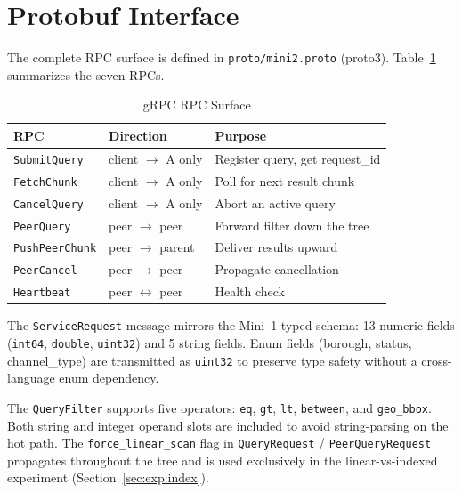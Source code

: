 \documentclass[conference]{IEEEtran}
\begin{document}
\section{Protobuf Interface}
\label{sec:proto}

The complete RPC surface is defined in \texttt{proto/mini2.proto} (proto3).
Table~\ref{tab:rpcs} summarizes the seven RPCs.

\begin{table}[h]
\centering
\caption{gRPC RPC Surface}
\label{tab:rpcs}
\begin{tabular}{lll}
\toprule
RPC & Direction & Purpose \\
\midrule
\texttt{SubmitQuery}   & client $\to$ A only  & Register query, get request\_id \\
\texttt{FetchChunk}   & client $\to$ A only  & Poll for next result chunk \\
\texttt{CancelQuery}  & client $\to$ A only  & Abort an active query \\
\texttt{PeerQuery}    & peer $\to$ peer      & Forward filter down the tree \\
\texttt{PushPeerChunk}& peer $\to$ parent    & Deliver results upward \\
\texttt{PeerCancel}   & peer $\to$ peer      & Propagate cancellation \\
\texttt{Heartbeat}    & peer $\leftrightarrow$ peer & Health check \\
\bottomrule
\end{tabular}
\end{table}

The \texttt{ServiceRequest} message mirrors the Mini~1 typed schema: 13
numeric fields (\texttt{int64}, \texttt{double}, \texttt{uint32}) and 5
string fields. Enum fields (borough, status, channel\_type) are transmitted
as \texttt{uint32} to preserve type safety without a cross-language enum
dependency.

The \texttt{QueryFilter} supports five operators: \texttt{eq}, \texttt{gt},
\texttt{lt}, \texttt{between}, and \texttt{geo\_bbox}. Both string and
integer operand slots are included to avoid string-parsing on the hot path.
The \texttt{force\_linear\_scan} flag in \texttt{QueryRequest} /
\texttt{PeerQueryRequest} propagates throughout the tree and is used
exclusively in the linear-vs-indexed experiment (Section~\ref{sec:exp:index}).

\end{document}
